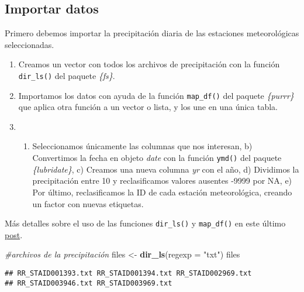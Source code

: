\documentclass[]{article}
\newenvironment{Shaded}{\begin{snugshade}}{\end{snugshade}}
\newcommand{\KeywordTok}[1]{\textcolor[rgb]{0.13,0.29,0.53}{\textbf{#1}}}
\newcommand{\DataTypeTok}[1]{\textcolor[rgb]{0.13,0.29,0.53}{#1}}
\newcommand{\DecValTok}[1]{\textcolor[rgb]{0.00,0.00,0.81}{#1}}
\newcommand{\StringTok}[1]{\textcolor[rgb]{0.31,0.60,0.02}{#1}}
\newcommand{\CommentTok}[1]{\textcolor[rgb]{0.56,0.35,0.01}{\textit{#1}}}
\newcommand{\OperatorTok}[1]{\textcolor[rgb]{0.81,0.36,0.00}{\textbf{#1}}}
\newcommand{\NormalTok}[1]{#1}
\providecommand{\tightlist}{%
  \setlength{\itemsep}{0pt}\setlength{\parskip}{0pt}}
\begin{document}
\subsection{Importar datos}\label{importar-datos}

Primero debemos importar la precipitación diaria de las estaciones
meteorológicas seleccionadas.

\begin{enumerate}
\def\labelenumi{\arabic{enumi}.}
\item
  Creamos un vector con todos los archivos de precipitación con la
  función \texttt{dir\_ls()} del paquete \emph{\{fs\}}.
\item
  Importamos los datos con ayuda de la función \texttt{map\_df()} del
  paquete \emph{\{purrr\}} que aplica otra función a un vector o lista,
  y los une en una única tabla.
\item
  \begin{enumerate}
  \def\labelenumii{\alph{enumii})}
  \tightlist
  \item
    Seleccionamos únicamente las columnas que nos interesan, b)
    Convertimos la fecha en objeto \emph{date} con la función
    \texttt{ymd()} del paquete \emph{\{lubridate\}}, c) Creamos una
    nueva columna \emph{yr} con el año, d) Dividimos la precipitación
    entre 10 y reclasificamos valores ausentes -9999 por NA, e) Por
    último, reclasificamos la ID de cada estación meteorológica, creando
    un factor con nuevas etiquetas.
  \end{enumerate}
\end{enumerate}

Más detalles sobre el uso de las funciones \texttt{dir\_ls()} y
\texttt{map\_df()} en este último
\href{https://dominicroye.github.io/en/2019/import-excel-sheets-with-r/}{post}.

\begin{Shaded}
\begin{Highlighting}[]
\CommentTok{#archivos de la precipitación}
\NormalTok{files <-}\StringTok{ }\KeywordTok{dir_ls}\NormalTok{(}\DataTypeTok{regexp =} \StringTok{"txt"}\NormalTok{)}
\NormalTok{files}
\end{Highlighting}
\end{Shaded}

\begin{verbatim}
## RR_STAID001393.txt RR_STAID001394.txt RR_STAID002969.txt 
## RR_STAID003946.txt RR_STAID003969.txt
\end{verbatim}

\begin{Shaded}
\end{Shaded}
\end{document}
